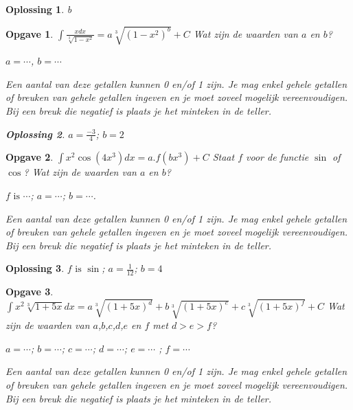\documentclass{article}
\newtheorem{opgave}{Opgave}
\newtheorem*{oplossing}{Oplossing}
\begin{document}
\begin{oplossing}
b
\end{oplossing}

\begin{opgave}
$\int \frac{xdx}{\sqrt[3]{1-x^2}}=a\sqrt[3]{(1-x^2)^b}+C$ Wat zijn de waarden van $a$ en $b$?\vspace{3mm}

\noindent $a=\cdots $, $b= \cdots$\vspace{1mm}

\noindent Een aantal van deze getallen kunnen 0 en/of 1 zijn. Je mag enkel gehele getallen of breuken van gehele getallen ingeven en je moet zoveel mogelijk vereenvoudigen. Bij een breuk die negatief is plaats je het minteken in de teller.

\begin{oplossing}
$a=\frac{-3}{4}$; $b=2$
\end{oplossing}


\end{opgave}

\begin{opgave}
$\int x^2 \cos (4x^3)dx=a.f(bx^3)+C$ Staat $f$ voor de functie $\sin$ of $\cos$? Wat zijn de waarden van $a$ en $b$?\vspace{3mm}

\noindent $f \text { is } \cdots $; $a=\cdots $; $b=\cdots $.\vspace{1mm}

\noindent Een aantal van deze getallen kunnen 0 en/of 1 zijn. Je mag enkel gehele getallen of breuken van gehele getallen ingeven en je moet zoveel mogelijk vereenvoudigen. Bij een breuk die negatief is plaats je het minteken in de teller.
\end{opgave}

\begin{oplossing}
$f \text { is } \sin$; $a=\frac{1}{12}$; $b=4$
\end{oplossing}

\begin{opgave}
$\int x^2 \sqrt[3]{1+5x}dx=a\sqrt[3]{(1+5x)^d}+b\sqrt[3]{(1+5x)^e}+c\sqrt[3]{(1+5x)^f}+C$ Wat zijn de waarden van $a$,$b$,$c$,$d$,$e$ en $f$ met $d>e>f$?\vspace{3mm}

\noindent $a= \cdots$; $b= \cdots$; $c= \cdots$; $d= \cdots$; $e=\cdots$ ; $f= \cdots$\vspace{1mm}

\noindent Een aantal van deze getallen kunnen 0 en/of 1 zijn. Je mag enkel gehele getallen of breuken van gehele getallen ingeven en je moet zoveel mogelijk vereenvoudigen. Bij een breuk die negatief is plaats je het minteken in de teller.
\end{opgave}
\end{document}
